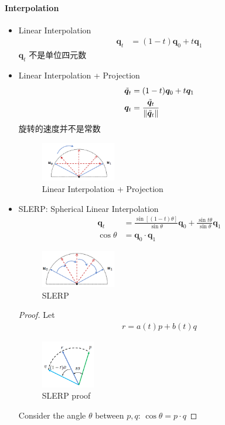 \paragraph{Interpolation}\quad
\begin{itemize}
    \item Linear Interpolation
    \begin{align*}
        {\bm q}_t &= (1-t)\bm q_0 + t\bm q_1
    \end{align*}
    $\bm q_t$ 不是单位四元数
    \item Linear Interpolation + Projection
    \begin{align*}
        \tilde{\bm q}_t &= (1-t)\bm q_0 + t\bm q_1\\
        \bm q_t &=\frac{\tilde{\bm q}_t}{\left\lVert\tilde{\bm q}_t\right\rVert}
    \end{align*}
    旋转的速度并不是常数
    
    \begin{figure}[!htb]
        \centering
        \includegraphics[width=0.309\textwidth]{pic/1052/Quaternion Interpolation}
        \caption{Linear Interpolation + Projection}
    \end{figure}
    \item SLERP: Spherical Linear Interpolation
    \begin{align*}
        \bm q_t &=\frac{\sin[(1-t)\theta]}{\sin\theta}\bm q_0 + \frac{\sin t\theta}{\sin \theta}\bm q_1\\
        \cos\theta&=\bm q_0\cdot\bm q_1
    \end{align*}
    
    \begin{figure}[!htb]
        \centering
        \includegraphics[width=0.309\textwidth]{pic/1052/SLERP}
        \caption{SLERP}
    \end{figure}
    \begin{proof}
        Let 
        \begin{align*}
            r = a(t)p+b(t)q
        \end{align*}
        \begin{figure}[!htb]
            \centering
            \includegraphics[width=0.22\textwidth]{pic/1052/SLERP proof.png}
            \caption{SLERP proof}
        \end{figure}
        Consider the angle $\theta$ between $p,q$: $\cos\theta=p\cdot q$


\end{proof}
\end{itemize}
